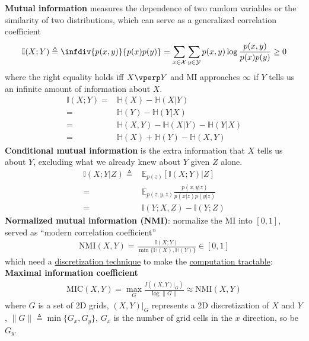 \textbf{Mutual information} measures the dependence of two random variables or the similarity of two distributions, which can serve as a generalized correlation coefficient
\begin{gather}
    \mathbb{I}(X;Y)\triangleq\infdiv{p(x,y)}{p(x)p(y)}
    =\sum_{x\in\mathcal{X}}\sum_{y\in\mathcal{Y}}p(x,y)\log\frac{p(x,y)}{p(x)p(y)}\geq 0
\end{gather}
where the right equality holds iff $X\vperp Y$ and MI approaches $\infty$ if $Y$ tells us an infinite amount of information about $X$.
\begin{align}
    \mathbb{I}(X;Y)
    =& \mathbb{H}(X)-\mathbb{H}(X|Y) \\
    =& \mathbb{H}(Y)-\mathbb{H}(Y|X) \\
    =& \mathbb{H}(X,Y)-\mathbb{H}(X|Y)-\mathbb{H}(Y|X) \\
    =& \mathbb{H}(X) + \mathbb{H}(Y) - \mathbb{H}(X,Y)
\end{align}
\textbf{Conditional mutual information} is the extra information that 
$X$ tells us about $Y$, excluding what we already knew about $Y$ given $Z$ alone.
\begin{align}
    \mathbb{I}(X;Y|Z)
    \triangleq& \mathbb{E}_{p(z)}[\mathbb{I}(X;Y)|Z] \\
    =& \mathbb{E}_{p(z,y,z)}\frac{p(x,y|z)}{p(x|z)p(y|z)} \\
    =& \mathbb{I}(Y;X,Z)-\mathbb{I}(Y;Z)
\end{align}
\textbf{Normalized mutual information (NMI)}: normalize the MI into $[0,1]$, served as ``modern correlation coefficient''
\begin{gather}
    \mathrm{NMI}(X,Y)=\frac{\mathbb{I}(X;Y)}{\min\{\mathbb{H}(X),\mathbb{H}(Y)\}}\in[0,1]
\end{gather}
which need a \uline{discretization technique} to make the \uline{computation tractable}:
\textbf{Maximal information coefficient}
\begin{gather}
    \mathrm{MIC}(X,Y)=\max_{G}\frac{I((X,Y)|_G)}{\log\|G\|}\approx\mathrm{NMI}(X,Y)
\end{gather}
where $G$ is a set of 2D grids, $(X,Y)|_G$ represents a 2D discretization of $X$ and $Y$,
$\|G\|\triangleq\min\{G_x,G_y\}$, $G_x$ is the number of grid cells in the $x$ direction, so be $G_y$.

